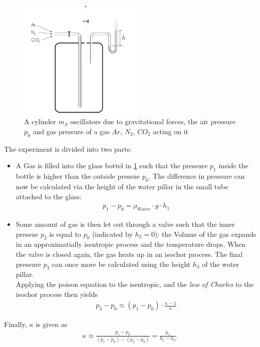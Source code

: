 \documentclass{subfiles}
\begin{document}
            \begin{figure}[H]
                \centering
                \includegraphics[width=6cm]{Bilddateien/Grundlagen/IsentropicClementDesormes.png}
                \caption{A cylinder $m_S$ oscillators due to gravitational forces, the air pressure $p_0$ and gas pressure of a gas $Ar$, $N_2$, $CO_2$ acting on it}
                \label{fig:ClementDesormes}
            \end{figure}

            The experiment is divided into two parts:
            \begin{itemize}
                \item A Gas is filled into the glass bottel in \ref{fig:ClementDesormes} such that the pressure $p_1$ inside the bottle is higher than the outside pressue $p_0$. The difference in pressure can now be calculated via the height of the water pillar in the small tube attached to the glass:
                \begin{align*}
                    p_1-p_0=\rho_{Water}\cdot g\cdot h_1
                \end{align*} 
                \item Some amount of gas is then let out through a valve such that the inner pressue $p_2$ is equal to $p_0$ (indicated by $h_2=0$): the Volume of the gas expands in an approximatially isentropic process and the temperature drops. When the valve is closed again, the gas heats up in an isochor process. The final pressure $p_3$ can once more be calculated using the height $h_3$ of the water pillar.\\
                
                \noindent Applying the poison equation to the isentropic, and the \textit{law of Charles} to the isochor process then yields
                \begin{align*}
                    p_3-p_0\approx(p_1-p_0)\cdot\frac{\kappa-1}{\kappa}
                \end{align*}
            \end{itemize}
            Finally, $\kappa$ is given as 
            \begin{align}
                \kappa\approx\frac{p_1-p_0}{(p_1-p_0)-(p_3-p_0)}=\frac{h_1}{h_1-h_3}.
                \label{eq:KappaCalculationClemens}
            \end{align} 


\end{document}
